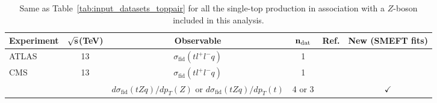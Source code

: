\begin{table}[h!]
{\fontsize{7pt}{7pt}\selectfont
  \centering
   \renewcommand{\arraystretch}{2}
   \setlength{\tabcolsep}{5pt}
   \begin{tabular}{lcccc|c}
     \toprule \textbf{Experiment}     & $\bf{\sqrt{s}}$\textbf{(TeV)}
     &  \textbf{Observable} & $\mathbf{n_{\rm dat}}$ & \textbf{Ref.}   
    &  \textbf{New (SMEFT fits)} \\
    \toprule
      ATLAS
      & 13
      & $\sigma_{\text{fid}}(tl^+l^-q)$
      & 1
      & \cite{Aad:2020wog}
      & \\
     \midrule
      CMS
      & 13
      & $\sigma_{\text{fid}}(tl^+l^-q)$
      & 1
      & \cite{Sirunyan:2018zgs}
      & \\
      & 
      & $d\sigma_{\text{fid}}(tZq)/dp_T(Z)$ or $d\sigma_{\text{fid}}(tZq)/dp_T(t)$
      & 4 or 3
      & \cite{CMS:2021rvz}
      & $\checkmark$\\
\bottomrule
  \end{tabular}
  \caption{\small Same as Table~\ref{tab:input_datasets_toppair} for all the single-top production in association with a $Z$-boson included in this analysis.
     \label{tab:input_datasets_4b}
}
}
\end{table}
